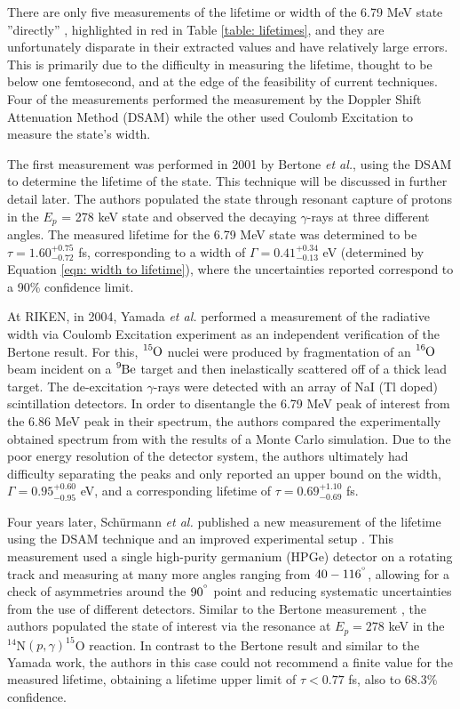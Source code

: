 There are only five measurements of the lifetime or width of the 6.79 MeV state ''directly'' \cite{Bertone2001, Yamada2004, Schurmann2008, Galinski2014, Michelagnoli2013}, highlighted in red in Table \ref{table: lifetimes}, and they are unfortunately disparate in their extracted values and have relatively large errors. This is primarily due to the difficulty in measuring the lifetime, thought to be below one femtosecond, and at the edge of the feasibility of current techniques. Four of the measurements \cite{Bertone2001, Schurmann2008, Galinski2014, Michelagnoli2013} performed the measurement by the Doppler Shift Attenuation Method (DSAM) while the other used Coulomb Excitation to measure the state's width.

The first measurement was performed in 2001 by Bertone \textit{et al.}, using the DSAM to determine the lifetime of the state. This technique will be discussed in further detail later. The authors populated the state through resonant capture of protons in the $E_{p}$ = 278 keV state and observed the decaying $\gamma$-rays at three different angles. The measured lifetime for the 6.79 MeV state was determined to be $\tau = 1.60^{+0.75}_{-0.72}$ fs, corresponding to a width of $\Gamma = 0.41^{+0.34}_{-0.13}$ eV (determined by Equation \ref{eqn: width to lifetime}), where the uncertainties reported correspond to a 90\% confidence limit. 

At RIKEN, in 2004, Yamada \textit{et al.} performed a measurement of the radiative width via Coulomb Excitation experiment \cite{Yamada2004} as an independent verification of the Bertone result. For this, $\ce{^{15}O}$ nuclei were produced by fragmentation of an $\ce{^{16}O}$ beam incident on a $\ce{^{9}Be}$ target and then inelastically scattered off of a thick lead target. The de-excitation $\gamma$-rays were detected with an array of NaI (Tl doped) scintillation detectors. In order to disentangle the 6.79 MeV peak of interest from the 6.86 MeV peak in their spectrum, the authors compared the experimentally obtained spectrum from with the results of a Monte Carlo simulation. Due to the poor energy resolution of the detector system, the authors ultimately had difficulty separating the peaks and only reported an upper bound on the width, $\Gamma = 0.95^{+0.60}_{-0.95}$ eV, and a corresponding lifetime of $\tau = 0.69 ^{+1.10}_{-0.69}$ fs. 

Four years later, Sch{\"u}rmann \textit{et al.} published a new measurement of the lifetime using the DSAM technique and an improved experimental setup \cite{Schurmann2008}. This measurement used a single high-purity germanium (HPGe) detector on a rotating track and measuring at many more angles ranging from $40 - 116^{\degree}$, allowing for a check of asymmetries around the $90^{\degree}$ point and reducing systematic uncertainties from the use of different detectors. Similar to the Bertone measurement \cite{Bertone2001}, the authors populated the state of interest via the resonance at $E_{p} = 278$ keV in the $^{14}$N$\left( p,\gamma \right) ^{15}$O reaction. In contrast to the Bertone result and similar to the Yamada work, the authors in this case could not recommend a finite value for the measured lifetime, obtaining a lifetime upper limit of $\tau < 0.77$ fs, also to 68.3\% confidence. 


